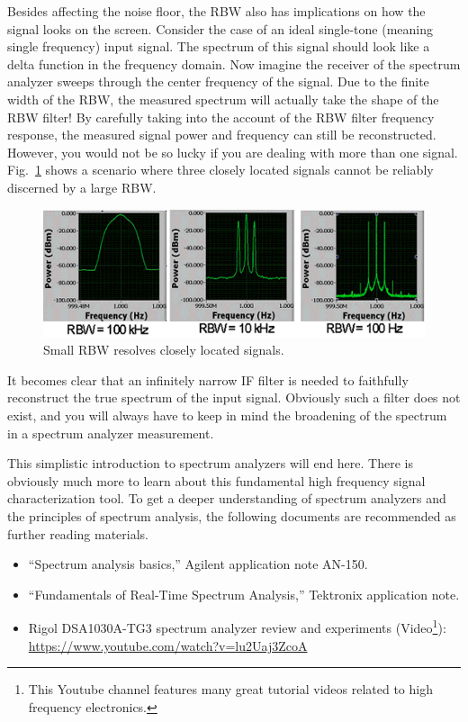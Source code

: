 \documentclass[letterpaper, 11pt]{article}
\begin{document}
Besides affecting the noise floor, the RBW also has implications on how the signal looks on the screen. Consider the case of an ideal single-tone (meaning single frequency) input signal. The spectrum of this signal should look like a delta function in the frequency domain. Now imagine the receiver of the spectrum analyzer sweeps through the center frequency of the signal. Due to the finite width of the RBW, the measured spectrum will actually take the shape of the RBW filter! By carefully taking into the account of the RBW filter frequency response, the measured signal power and frequency can still be reconstructed. However, you would not be so lucky if you are dealing with more than one signal. Fig.~\ref{fig:sa-rbw} shows a scenario where three closely located signals cannot be reliably discerned by a large RBW. 

\begin{figure}[h]
	\centering
	\includegraphics[width=4.5in]{sa-rbw}
	\caption{Small RBW resolves closely located signals.}
	\label{fig:sa-rbw}
\end{figure}

It becomes clear that an infinitely narrow IF filter is needed to faithfully reconstruct the true spectrum of the input signal. Obviously such a filter does not exist, and you will always have to keep in mind the broadening of the spectrum in a spectrum analyzer measurement. 

This simplistic introduction to spectrum analyzers will end here. There is obviously much more to learn about this fundamental high frequency signal characterization tool. To get a deeper understanding of spectrum analyzers and the principles of spectrum analysis, the following documents are recommended as further reading materials. 

\begin{itemize}[itemsep=0.1ex]
	\item ``Spectrum analysis basics,'' Agilent application note AN-150.
	\item ``Fundamentals of Real-Time Spectrum Analysis,'' Tektronix application note.
	\item Rigol DSA1030A-TG3 spectrum analyzer review and experiments (Video\footnote{This Youtube channel features many great tutorial videos related to high frequency electronics.}):\\  \url{https://www.youtube.com/watch?v=lu2Uaj3ZcoA }
\end{itemize}
\end{document}
